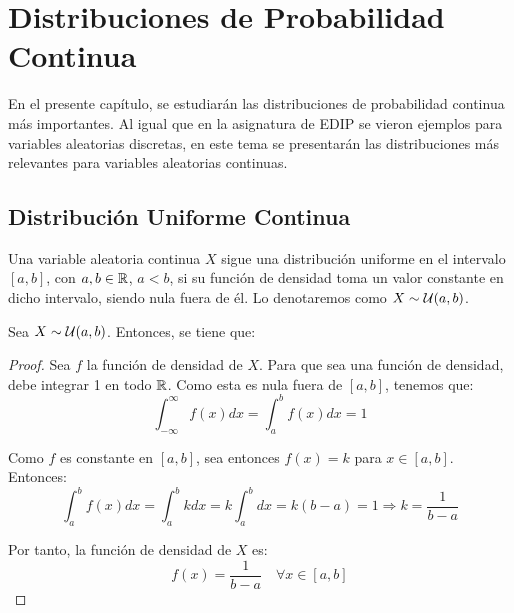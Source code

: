 \chapter{Distribuciones de Probabilidad Continua}

En el presente capítulo, se estudiarán las distribuciones de probabilidad continua más importantes. Al igual que 
en la asignatura de EDIP se vieron ejemplos para variables aleatorias discretas, en este tema se presentarán las distribuciones más
relevantes para variables aleatorias continuas.

\section{Distribución Uniforme Continua}

\begin{definicion}
    Una variable aleatoria continua $X$ sigue una distribución uniforme en el intervalo $[a,b]$, con $a,b\in \mathbb{R}$, $a<b$, si su función de densidad
    toma un valor constante en dicho intervalo, siendo nula fuera de él.
    Lo denotaremos como $X\sim \mathcal{U}(a,b)$.
\end{definicion}

\begin{prop}
    Sea $X\sim \mathcal{U}(a,b)$. Entonces, se tiene que:
\end{prop}
\begin{proof}
    Sea $f$ la función de densidad de $X$.
    Para que sea una función de densidad, debe integrar 1 en todo $\mathbb{R}$.
    Como esta es nula fuera de $[a,b]$, tenemos que:
    \begin{equation*}
        \int_{-\infty}^{\infty} f(x)dx = \int_{a}^{b} f(x)dx = 1
    \end{equation*}

    Como $f$ es constante en $[a,b]$, sea entonces $f(x) = k$ para $x\in [a,b]$. Entonces:
    \begin{equation*}
        \int_{a}^{b} f(x)dx =
        \int_{a}^{b} kdx = k\int_{a}^{b} dx = k(b-a) = 1 \Longrightarrow k = \frac{1}{b-a}
    \end{equation*}

    Por tanto, la función de densidad de $X$ es:
    \begin{equation*}
        f(x) = \frac{1}{b-a} \quad \forall x\in [a,b]
    \end{equation*}
\end{proof}


